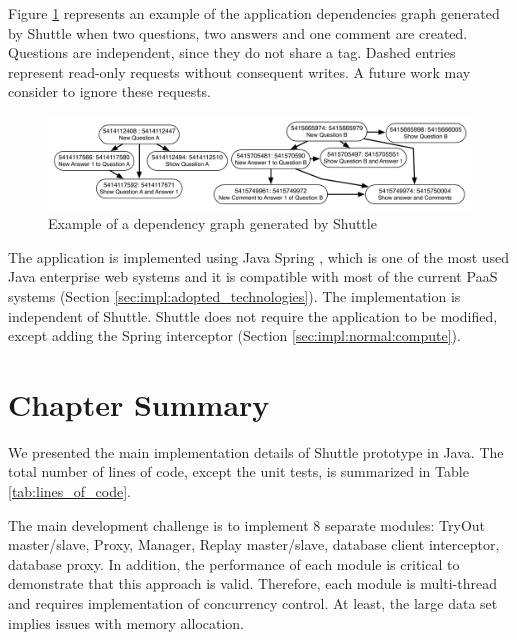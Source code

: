 Figure \ref{fig:dependencyGraph} represents an example of the application dependencies graph generated by Shuttle when two questions, two answers and one comment are created. Questions are independent, since they do not share a tag. Dashed entries represent read-only requests without consequent writes. A future work may consider to ignore these requests.

\begin{figure}
  \centering
  \includegraphics[width=150mm]{images/dependencyGraph}
  \caption{Example of a dependency graph generated by Shuttle}
  \label{fig:dependencyGraph}
\end{figure}

The application is implemented using Java Spring \cite{spring}, which is one of the most used Java enterprise web systems and it is compatible with most of the current \ac{PaaS} systems (Section \ref{sec:impl:adopted_technologies}). The implementation is independent of Shuttle. Shuttle does not require the application to be modified, except adding the Spring interceptor (Section \ref{sec:impl:normal:compute}). 


\section{Chapter Summary}\label{sec:impl:summary}
We presented the main implementation details of Shuttle prototype in Java. The total number of lines of code, except the unit tests, is summarized in Table \ref{tab:lines_of_code}.

The main development challenge is to implement 8 separate modules: TryOut master/slave, Proxy, Manager, Replay master/slave, database client interceptor, database proxy. In addition, the performance of each module is critical to demonstrate that this approach is valid. Therefore, each module is multi-thread and requires implementation of concurrency control. At least, the large data set implies issues with memory allocation.

